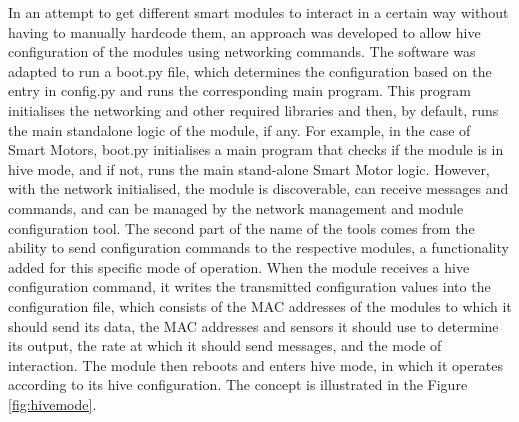 \begin{itemize}
    In an attempt to get different smart modules to interact in a certain way without having to manually hardcode them, an approach was developed to allow hive configuration of the modules using networking commands. The software was adapted to run a boot.py file, which determines the configuration based on the entry in config.py and runs the corresponding main program. This program initialises the networking and other required libraries and then, by default, runs the main standalone logic of the module, if any. For example, in the case of Smart Motors, boot.py initialises a main program that checks if the module is in hive mode, and if not, runs the main stand-alone Smart Motor logic. However, with the network initialised, the module is discoverable, can receive messages and commands, and can be managed by the network management and module configuration tool. The second part of the name of the tools comes from the ability to send configuration commands to the respective modules, a functionality added for this specific mode of operation. When the module receives a hive configuration command, it writes the transmitted configuration values into the configuration file, which consists of the MAC addresses of the modules to which it should send its data, the MAC addresses and sensors it should use to determine its output, the rate at which it should send messages, and the mode of interaction. The module then reboots and enters hive mode, in which it operates according to its hive configuration. The concept is illustrated in the Figure \ref{fig:hivemode}.
\end{itemize}

